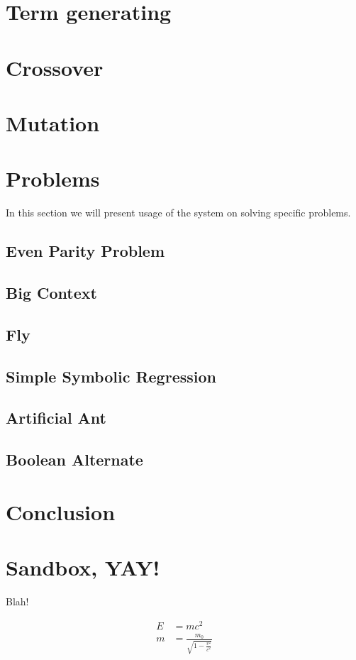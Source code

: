 \documentclass[12pt]{article}
\begin{document}
	\section{Term generating}
	\section{Crossover}
	\section{Mutation}
	
	\section{Problems}
	In this section we will present usage of the system on solving specific problems.
		
	
		\subsection{Even Parity Problem}
		\subsection{Big Context}
		\subsection{Fly}
		\subsection{Simple Symbolic Regression}
		\subsection{Artificial Ant}
		\subsection{Boolean Alternate}
	
	\section{Conclusion}
	
	

	
	\section{Sandbox, YAY!}
	
	Blah!	
	
  	
  	\begin{align}
    	E &= mc^2                              \\
    	m &= \frac{m_0}{\sqrt{1-\frac{v^2}{c^2}}}
  	\end{align}
	
	
\end{document}

